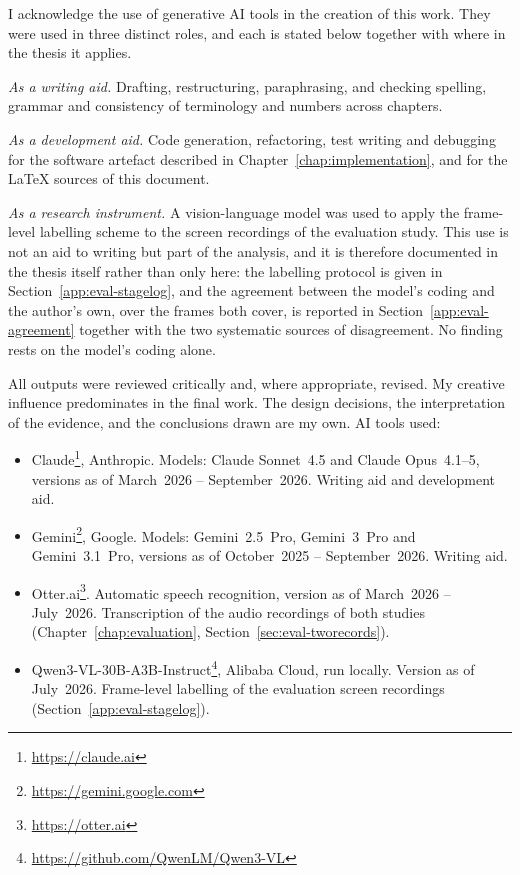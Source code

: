 I acknowledge the use of generative AI tools in the creation of this work. They
were used in three distinct roles, and each is stated below together with where
in the thesis it applies.

\emph{As a writing aid.} Drafting, restructuring, paraphrasing, and checking
spelling, grammar and consistency of terminology and numbers across chapters.

\emph{As a development aid.} Code generation, refactoring, test writing and
debugging for the software artefact described in
Chapter~\ref{chap:implementation}, and for the \LaTeX{} sources of this
document.

\emph{As a research instrument.} A vision-language model was used to apply the
frame-level labelling scheme to the screen recordings of the evaluation study.
This use is not an aid to writing but part of the analysis, and it is therefore
documented in the thesis itself rather than only here: the labelling protocol is
given in Section~\ref{app:eval-stagelog}, and the agreement between the model's
coding and the author's own, over the frames both cover, is reported in
Section~\ref{app:eval-agreement} together with the two systematic sources of
disagreement. No finding rests on the model's coding alone.

All outputs were reviewed critically and, where appropriate, revised. My
creative influence predominates in the final work. The design decisions, the
interpretation of the evidence, and the conclusions drawn are my own. AI tools used:

\begin{itemize}
  \item Claude\footnote{\url{https://claude.ai}}, Anthropic. Models: Claude
        Sonnet~4.5 and Claude Opus~4.1--5, versions as of March~2026 --
        September~2026. Writing aid and development aid.
  \item Gemini\footnote{\url{https://gemini.google.com}}, Google. Models: Gemini~2.5~Pro,
        Gemini~3~Pro and Gemini~3.1~Pro, versions as of October~2025 --
        September~2026. Writing aid.
  \item Otter.ai\footnote{\url{https://otter.ai}}. Automatic speech
        recognition, version as of March~2026 -- July~2026. Transcription of
        the audio recordings of both studies
        (Chapter~\ref{chap:evaluation}, Section~\ref{sec:eval-tworecords}).
  \item Qwen3-VL-30B-A3B-Instruct\footnote{\url{https://github.com/QwenLM/Qwen3-VL}},
        Alibaba Cloud, run locally. Version as of July~2026. Frame-level
        labelling of the evaluation screen recordings
        (Section~\ref{app:eval-stagelog}).
\end{itemize}
